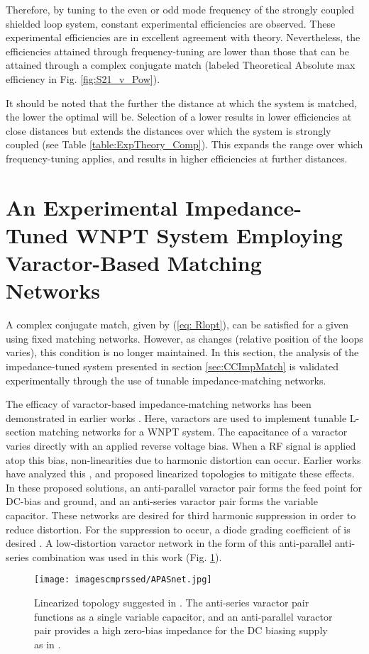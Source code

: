 \documentclass[journal]{IEEEtran}
\begin{document}
Therefore, by tuning to the even or odd mode frequency of the strongly coupled shielded loop system, constant experimental efficiencies are observed. These experimental efficiencies are in excellent agreement with theory. Nevertheless, the efficiencies attained through frequency-tuning are lower than those that can be attained through a complex conjugate match (labeled Theoretical Absolute max efficiency in  Fig. \ref{fig:S21_v_Pow}).

It should be noted that the further the distance at which the system is matched, the lower the optimal  will be. Selection of a lower  results in lower efficiencies at close distances but extends the distances over which the system is strongly coupled (see Table \ref{table:ExpTheory_Comp}). This expands the range over which frequency-tuning applies, and results in higher efficiencies at further distances.

\section{An Experimental Impedance-Tuned WNPT System Employing Varactor-Based Matching Networks}
\label{sec:LP_Varactors}

A complex conjugate match, given by (\ref{eq: Rlopt}), can be satisfied for a given  using fixed matching networks. However, as  changes (relative position of the loops varies), this condition is no longer maintained. In this section, the analysis of the impedance-tuned system presented in section \ref{sec:CCImpMatch} is validated experimentally through the use of tunable impedance-matching networks.

The efficacy of varactor-based impedance-matching networks has been demonstrated in earlier works \cite{VaracMatch, VaracAmps}. Here, varactors are used to implement tunable L-section matching networks for a WNPT system. The capacitance of a varactor varies directly with an applied reverse voltage bias. When a RF signal is applied atop this bias, non-linearities due to harmonic distortion can occur. Earlier works have analyzed this \cite{Meyer-Varacts,Buis1,Buis2}, and proposed linearized topologies to mitigate these effects. In these proposed solutions, an anti-parallel varactor pair forms the feed point for DC-bias and ground, and an anti-series varactor pair forms the variable capacitor. These networks are desired for third harmonic suppression in order to reduce distortion. For the suppression to occur, a diode grading coefficient of  is desired \cite{Meyer-Varacts}. A low-distortion varactor network in the form of this anti-parallel anti-series combination was used in this work (Fig. \ref{fig:APASnet}).
\begin{figure}[htbp]
    \centering
    \texttt{[image: imagescmprssed/APASnet.jpg]}
    \caption{Linearized topology suggested in \cite{Buis1, Buis2}. The anti-series varactor pair functions as a single variable capacitor, and an anti-parallel varactor pair provides a high zero-bias impedance for the DC biasing supply as in \cite{Buis3}.}
    \label{fig:APASnet}
\end{figure}
\end{document}
